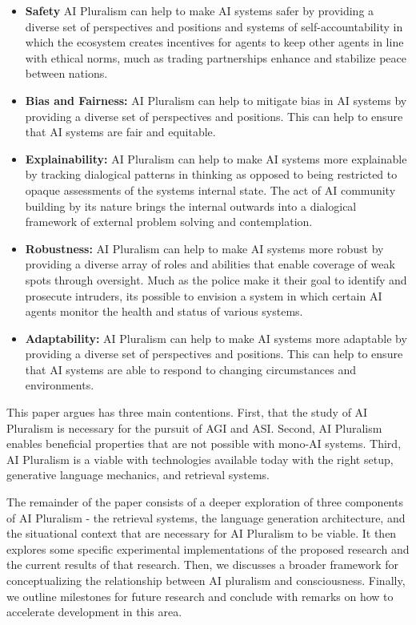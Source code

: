 \begin{itemize}
    \item \textbf{Safety} AI Pluralism can help to make AI systems safer by providing a diverse set of perspectives and positions and systems of self-accountability in which the ecosystem creates incentives for agents to keep other agents in line with ethical norms, much as trading partnerships enhance and stabilize peace between nations.
    \item \textbf{Bias and Fairness:} AI Pluralism can help to mitigate bias in AI systems by providing a diverse set of perspectives and positions. This can help to ensure that AI systems are fair and equitable.
    \item \textbf{Explainability:} AI Pluralism can help to make AI systems more explainable by tracking dialogical patterns in thinking as opposed to being restricted to opaque assessments of the systems internal state. The act of AI community building by its nature brings the internal outwards into a dialogical framework of external problem solving and contemplation.
    \item \textbf{Robustness:} AI Pluralism can help to make AI systems more robust by providing a diverse array of roles and abilities that enable coverage of weak spots through oversight. Much as the police make it their goal to identify and prosecute intruders, its possible to envision a system in which certain AI agents monitor the health and status of various systems.
    \item \textbf{Adaptability:} AI Pluralism can help to make AI systems more adaptable by providing a diverse set of perspectives and positions. This can help to ensure that AI systems are able to respond to changing circumstances and environments.

\end{itemize}

This paper argues has three main contentions. First, that the study of AI Pluralism is necessary for the pursuit of AGI and ASI. Second, AI Pluralism enables beneficial properties that are not possible with mono-AI systems. Third, AI Pluralism is a viable with technologies available today with the right setup, generative language mechanics, and retrieval systems.

The remainder of the paper consists of a deeper exploration of three components of AI Pluralism - the retrieval systems, the language generation architecture, and the situational context that are necessary for AI Pluralism to be viable. It then explores some specific experimental implementations of the proposed research and the current results of that research. Then, we discusses a broader framework for conceptualizing the relationship between AI pluralism and consciousness. Finally, we outline milestones for future research and conclude with remarks on how to accelerate development in this area.